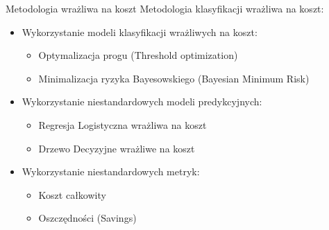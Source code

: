 \documentclass[10pt]{beamer}
\begin{document}
\begin{frame}{Metodologia wrażliwa na koszt}
    Metodologia klasyfikacji wrażliwa na koszt:
    \begin{itemize}
        \item Wykorzystanie modeli klasyfikacji wrażliwych na koszt:
            \begin{itemize}
                \item Optymalizacja progu (Threshold optimization)
                \item Minimalizacja ryzyka Bayesowskiego (Bayesian Minimum Risk)
            \end{itemize}{}
        \item Wykorzystanie niestandardowych modeli predykcyjnych:
            \begin{itemize}
                \item Regresja Logistyczna wrażliwa na koszt
                \item Drzewo Decyzyjne wrażliwe na koszt
            \end{itemize}
        \item Wykorzystanie niestandardowych metryk:
            \begin{itemize}
                \item Koszt całkowity
                \item Oszczędności (Savings)
            \end{itemize}{}
    \end{itemize}
\end{frame}{}
\end{document}

